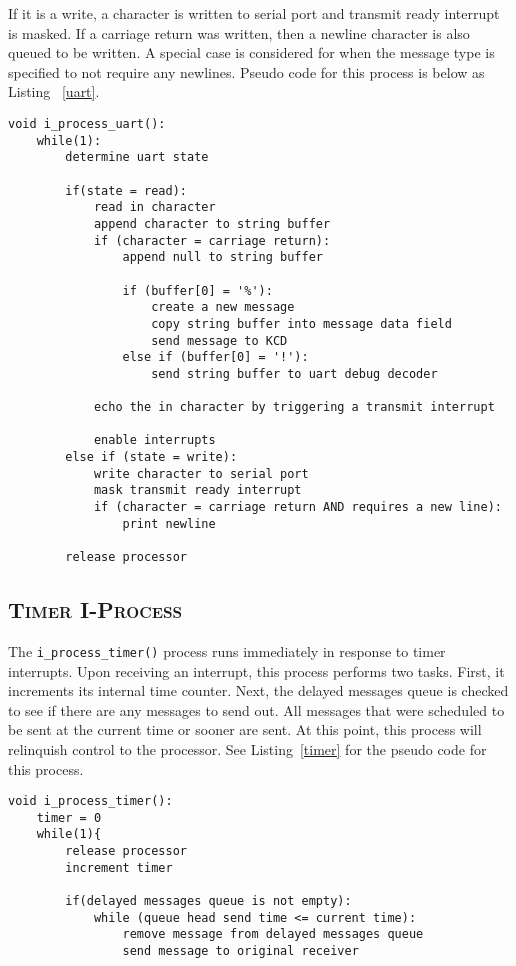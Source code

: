 \documentclass[oneside]{report}
\begin{document}
If it is a write, a character is written to serial port and transmit
ready interrupt is masked. If a carriage return was written, then a
newline character is also queued to be written. A special case is
considered for when the message type is specified to not require any
newlines. Pseudo code for this process is below as Listing
~\ref{uart}.

\begin{lstlisting}
void i_process_uart():
    while(1):
        determine uart state

        if(state = read):
            read in character
            append character to string buffer
            if (character = carriage return):
                append null to string buffer            

                if (buffer[0] = '%'):
                    create a new message
                    copy string buffer into message data field
                    send message to KCD
                else if (buffer[0] = '!'):
                    send string buffer to uart debug decoder

            echo the in character by triggering a transmit interrupt

            enable interrupts
        else if (state = write):
            write character to serial port
            mask transmit ready interrupt
            if (character = carriage return AND requires a new line):
                print newline
            
        release processor
\end{lstlisting}

\subsection{\textsc{Timer I-Process}}
The \texttt{i\_process\_timer()} process runs immediately in response
to timer interrupts. Upon receiving an interrupt, this process
performs two tasks. First, it increments its internal time
counter. Next, the delayed messages queue is checked to see if there
are any messages to send out. All messages that were scheduled to be
sent at the current time or sooner are sent. At this point, this
process will relinquish control to the processor. See
Listing~\ref{timer} for the pseudo code for this process.

\begin{lstlisting}
void i_process_timer():
    timer = 0
    while(1){
        release processor
        increment timer

        if(delayed messages queue is not empty):
            while (queue head send time <= current time):
                remove message from delayed messages queue
                send message to original receiver
\end{lstlisting}
\end{document}
